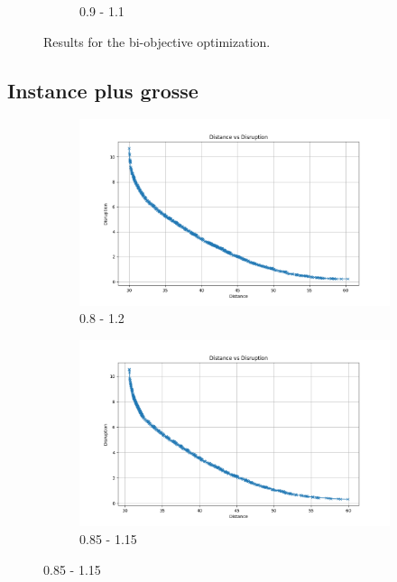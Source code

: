 \documentclass[12pt,a4paper]{article}
\begin{document}
\begin{figure}[H]
\begin{subfigure}{0.32\textwidth}
        \caption{0.9 - 1.1}
        \label{fig:solve3}
    \end{subfigure}
    \caption{Results for the bi-objective optimization.}
    \label{fig:all_solves}
\end{figure}

\subsection*{Instance plus grosse}

\begin{figure}[H]
    \centering
    \begin{subfigure}{0.32\textwidth}
        \centering
        \includegraphics[width=\textwidth]{figures/solve1-100-0.8.png}
        \caption{0.8 - 1.2}
        \label{fig:solve1}
    \end{subfigure}
    \hfill
    \begin{subfigure}{0.32\textwidth}
        \centering
        \includegraphics[width=\textwidth]{figures/solve1-100-0.85.png}
        \caption{0.85 - 1.15}

\end{subfigure}
\end{figure}
\end{document}
